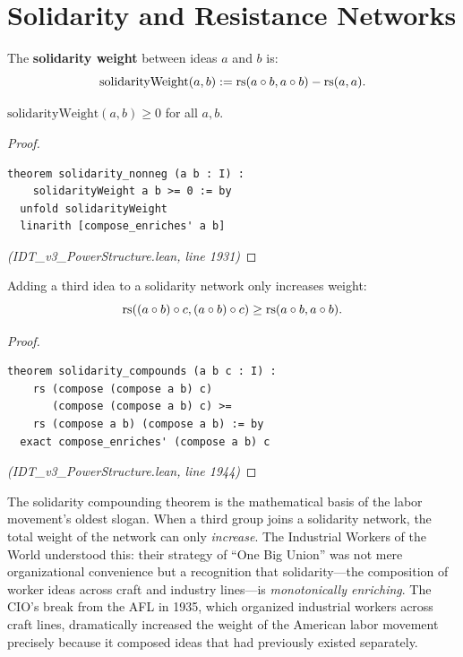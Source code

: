 \section{Solidarity and Resistance Networks}

\begin{definition}
\label{def:solidarity}
The \textbf{solidarity weight} between ideas $a$ and $b$ is:
\[
  \mathrm{solidarityWeight}(a, b) := \mathrm{rs}(a \circ b, a \circ b) - \mathrm{rs}(a, a).
\]
\end{definition}

\begin{theorem}
\label{thm:solidarity-nonneg}
$\mathrm{solidarityWeight}(a, b) \geq 0$ for all $a, b$.
\end{theorem}

\begin{proof}
\begin{lstlisting}
theorem solidarity_nonneg (a b : I) :
    solidarityWeight a b >= 0 := by
  unfold solidarityWeight
  linarith [compose_enriches' a b]
\end{lstlisting}
\textit{(IDT\_v3\_PowerStructure.lean, line 1931)}
\end{proof}

\begin{theorem}
\label{thm:solidarity-compounds}
Adding a third idea to a solidarity network only increases weight:
\[
  \mathrm{rs}((a \circ b) \circ c, (a \circ b) \circ c) \geq \mathrm{rs}(a \circ b, a \circ b).
\]
\end{theorem}

\begin{proof}
\begin{lstlisting}
theorem solidarity_compounds (a b c : I) :
    rs (compose (compose a b) c)
       (compose (compose a b) c) >=
    rs (compose a b) (compose a b) := by
  exact compose_enriches' (compose a b) c
\end{lstlisting}
\textit{(IDT\_v3\_PowerStructure.lean, line 1944)}
\end{proof}

\begin{interpretation}
The solidarity compounding theorem is the mathematical basis of the labor
movement's oldest slogan. When a third group joins a solidarity network, the
total weight of the network can only \emph{increase}. The Industrial Workers
of the World understood this: their strategy of ``One Big Union'' was not
mere organizational convenience but a recognition that solidarity---the
composition of worker ideas across craft and industry lines---is
\emph{monotonically enriching}. The CIO's break from the AFL in 1935, which
organized industrial workers across craft lines, dramatically increased the
weight of the American labor movement precisely because it composed ideas
that had previously existed separately.
\end{interpretation}

